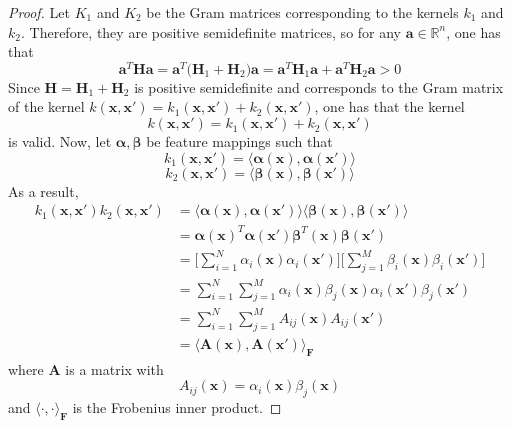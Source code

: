 \begin{proof}
    Let $K_1$ and $K_2$ be the Gram matrices corresponding to the 
    kernels $k_1$ and $k_2$. Therefore, they are positive semidefinite matrices, so
    for any $\mathbf{a} \in \mathbb{R}^n$, one has that
    \[
        \mathbf{a}^T\mathbf{H}\mathbf{a}
        = \mathbf{a}^T\big(\mathbf{H}_1 + \mathbf{H}_2\big)\mathbf{a}
        = \mathbf{a}^T \mathbf{H}_1 \mathbf{a} + \mathbf{a}^T \mathbf{H}_2 \mathbf{a} > 0
    \] 
    Since $\mathbf{H} = \mathbf{H}_1 + \mathbf{H}_2$ is positive semidefinite
    and corresponds to the Gram matrix of the 
    kernel $k(\mathbf{x}, \mathbf{x}') = k_1(\mathbf{x}, \mathbf{x'}) + 
    k_2(\mathbf{x}, \mathbf{x}')$, one has that the kernel
    \begin{equation}\label{eq:6.17}\tag{6.17}
        k(\mathbf{x}, \mathbf{x}') = k_1(\mathbf{x}, \mathbf{x}') + k_2(\mathbf{x}, \mathbf{x}')
    \end{equation}
    is valid. Now, let $\bm{\alpha}, \bm{\beta}$ be feature mappings such that
    \[
        k_1(\mathbf{x}, \mathbf{x}') 
        = \langle \bm{\alpha}(\mathbf{x}), \bm{\alpha}(\mathbf{x}') \rangle 
    \] 
    \[
        k_2(\mathbf{x}, \mathbf{x}') 
        = \langle \bm{\beta}(\mathbf{x}), \bm{\beta}(\mathbf{x}') \rangle 
    \]
    As a result,
    \begin{align*}
        k_1(\mathbf{x}, \mathbf{x}') k_2(\mathbf{x}, \mathbf{x}')
        &= \langle \bm{\alpha}(\mathbf{x}), \bm{\alpha}(\mathbf{x}') \rangle 
        \langle \bm{\beta}(\mathbf{x}), \bm{\beta}(\mathbf{x}') \rangle \\
        &= \bm{\alpha}(\mathbf{x})^T \bm{\alpha}(\mathbf{x}')
        \bm{\beta}^T(\mathbf{x}) \bm{\beta}(\mathbf{x}') \\
        &= \bigg[\sum_{i=1}^{N} \alpha_i(\mathbf{x}) \alpha_i(\mathbf{x}')\bigg]
        \bigg[\sum_{j=1}^{M} \beta_i(\mathbf{x}) \beta_i(\mathbf{x}')\bigg] \\
        &= \sum_{i=1}^{N} \sum_{j=1}^{M} \alpha_i(\mathbf{x}) \beta_j(\mathbf{x})
        \alpha_i(\mathbf{x}') \beta_j(\mathbf{x}') \tag{*}\\
        &= \sum_{i=1}^{N} \sum_{j=1}^{M}  A_{ij}(\mathbf{x}) A_{ij}(\mathbf{x}') \\
        &= \langle \mathbf{A}(\mathbf{x}), \mathbf{A}(\mathbf{x'}) \rangle_\mathbf{F}
    \end{align*}
    where $\mathbf{A}$ is a matrix with
    \[
        A_{ij}(\mathbf{x}) = \alpha_i(\mathbf{x}) \beta_j(\mathbf{x})
    \] 
    and $\langle \cdot, \cdot \rangle_\mathbf{F}$ is the Frobenius inner product.

\end{proof}
